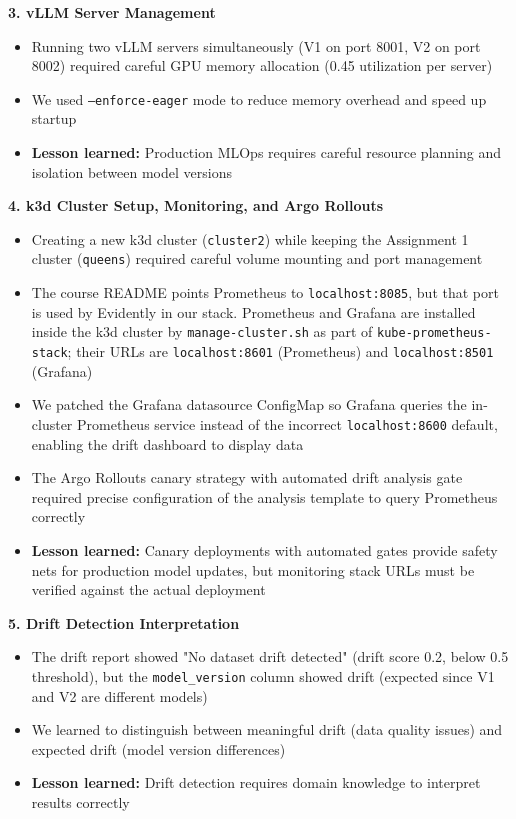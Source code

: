 \documentclass[11pt,a4paper]{article}
\begin{document}
\textbf{3. vLLM Server Management}
\begin{itemize}
\item Running two vLLM servers simultaneously (V1 on port 8001, V2 on port 8002) required careful GPU memory allocation (0.45 utilization per server)
\item We used \texttt{--enforce-eager} mode to reduce memory overhead and speed up startup
\item \textbf{Lesson learned:} Production MLOps requires careful resource planning and isolation between model versions
\end{itemize}

\textbf{4. k3d Cluster Setup, Monitoring, and Argo Rollouts}
\begin{itemize}
\item Creating a new k3d cluster (\texttt{cluster2}) while keeping the Assignment 1 cluster (\texttt{queens}) required careful volume mounting and port management
\item The course README points Prometheus to \texttt{localhost:8085}, but that port is used by Evidently in our stack. Prometheus and Grafana are installed inside the k3d cluster by \texttt{manage-cluster.sh} as part of \texttt{kube-prometheus-stack}; their URLs are \texttt{localhost:8601} (Prometheus) and \texttt{localhost:8501} (Grafana)
\item We patched the Grafana datasource ConfigMap so Grafana queries the in-cluster Prometheus service instead of the incorrect \texttt{localhost:8600} default, enabling the drift dashboard to display data
\item The Argo Rollouts canary strategy with automated drift analysis gate required precise configuration of the analysis template to query Prometheus correctly
\item \textbf{Lesson learned:} Canary deployments with automated gates provide safety nets for production model updates, but monitoring stack URLs must be verified against the actual deployment
\end{itemize}

\textbf{5. Drift Detection Interpretation}
\begin{itemize}
\item The drift report showed "No dataset drift detected" (drift score 0.2, below 0.5 threshold), but the \texttt{model\_version} column showed drift (expected since V1 and V2 are different models)
\item We learned to distinguish between meaningful drift (data quality issues) and expected drift (model version differences)
\item \textbf{Lesson learned:} Drift detection requires domain knowledge to interpret results correctly
\end{itemize}
\end{document}
